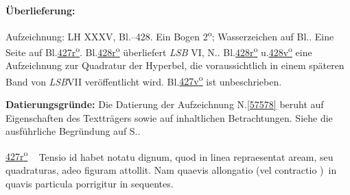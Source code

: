 %
\frenchspacing%
\begin{ledgroupsized}[r]{120mm}%
\footnotesize%
\pstart%
\noindent%
\textbf{Überlieferung:}%
\pend%
\end{ledgroupsized}%
\begin{ledgroupsized}[r]{114mm}%
\footnotesize%
\pstart%
\parindent -6mm%
%
Aufzeichnung:
LH XXXV, Bl.--428.
Ein Bogen 2\textsuperscript{o};
Wasserzeichen auf Bl..
Eine Seite auf Bl.\;\href{\Scan{LH_35_13_01_427r}}{427\:r\textsuperscript{o}}.
Bl.\;\href{\Scan{LH_35_13_01_428r}}{428\:r\textsuperscript{o}} überliefert \textit{LSB} VI, N.. %
Bl.\;\href{\Scan{LH_35_13_01_428r}}{428\:r\textsuperscript{o}} u.\;\href{\Scan{LH_35_13_01_428v}}{428\:v\textsuperscript{o}} eine Aufzeichnung zur Quadratur der Hyperbel, %
die voraussichtlich in einem späteren Band von \textit{LSB}\;VII veröffentlicht wird.
Bl.\;\href{\Scan{LH_35_13_01_427v}}{427\:v\textsuperscript{o}} ist unbeschrieben.
\pend%
\end{ledgroupsized}%
\vspace{4mm}%
\begin{ledgroup}%
\footnotesize%
\pstart%
\noindent%
\textbf{Datierungsgründe:}
Die Datierung der Aufzeichnung N.\;\ref{57578} beruht auf Eigenschaften des Textträgers sowie auf inhaltlichen Betrachtungen.
Siehe die ausführliche Begründung auf S.\;\pageref{57578_dat}.%
\pend%
\end{ledgroup}%
%
\frenchspacing%
\vspace{6mm}%
\normalsize%
\pstart%
\noindent%
\lbrack%
\href{\Scan{LH_35_13_01_427r}}%
{427\:r\textsuperscript{o}}%
\rbrack\ %
Tensio%
id habet notatu dignum,
quod in linea repraesentat aream,%
seu quadraturas,%
adeo
figuram attollit.%
Nam quaevis allongatio%
(vel contractio%
%
\lbrack)\rbrack\
in quavis particula%
porrigitur in
%
sequentes.%
%
